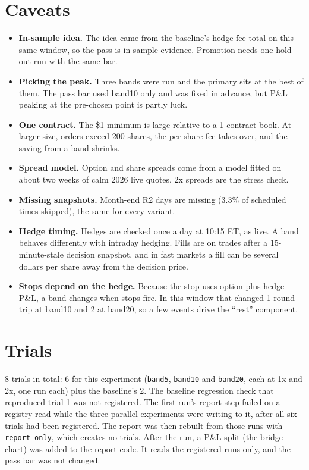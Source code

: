 \documentclass{article}
\begin{document}
\section{Caveats}

\begin{itemize}

\item \textbf{In-sample idea.} The idea came from the baseline's hedge-fee total on this same window, so the pass is in-sample evidence. Promotion needs one hold-out run with the same bar.

\item \textbf{Picking the peak.} Three bands were run and the primary sits at the best of them. The pass bar used band10 only and was fixed in advance, but P\&L peaking at the pre-chosen point is partly luck.

\item \textbf{One contract.} The \$1 minimum is large relative to a 1-contract book. At larger size, orders exceed 200 shares, the per-share fee takes over, and the saving from a band shrinks.

\item \textbf{Spread model.} Option and share spreads come from a model fitted on about two weeks of calm 2026 live quotes. 2x spreads are the stress check.

\item \textbf{Missing snapshots.} Month-end R2 days are missing (3.3\% of scheduled times skipped), the same for every variant.

\item \textbf{Hedge timing.} Hedges are checked once a day at 10:15 ET, as live. A band behaves differently with intraday hedging. Fills are on trades after a 15-minute-stale decision snapshot, and in fast markets a fill can be several dollars per share away from the decision price.

\item \textbf{Stops depend on the hedge.} Because the stop uses option-plus-hedge P\&L, a band changes when stops fire. In this window that changed 1 round trip at band10 and 2 at band20, so a few events drive the ``rest'' component.

\end{itemize}

\section{Trials}

8 trials in total: 6 for this experiment (\texttt{band5}, \texttt{band10} and \texttt{band20}, each at 1x and 2x, one run each) plus the baseline's 2. The baseline regression check that reproduced trial 1 was not registered. The first run's report step failed on a registry read while the three parallel experiments were writing to it, after all six trials had been registered. The report was then rebuilt from those runs with \texttt{-\allowbreak{}-\allowbreak{}report-\allowbreak{}only}, which creates no trials. After the run, a P\&L split (the bridge chart) was added to the report code. It reads the registered runs only, and the pass bar was not changed.
\end{document}

